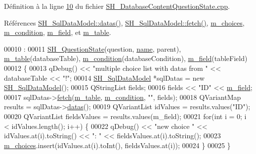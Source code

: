 Définition à la ligne \hyperlink{SH__DatabaseContentQuestionState_8cpp_source_l00010}{10} du fichier \hyperlink{SH__DatabaseContentQuestionState_8cpp_source}{S\-H\-\_\-\-Database\-Content\-Question\-State.\-cpp}.



Références \hyperlink{classSH__SqlDataModel_a6d91d42cfaf86d1fbbaeeb7a32efc26b}{S\-H\-\_\-\-Sql\-Data\-Model\-::datas()}, \hyperlink{classSH__SqlDataModel_a8d9b08d282a304945b9ee2f474020980}{S\-H\-\_\-\-Sql\-Data\-Model\-::fetch()}, \hyperlink{classSH__DatabaseContentQuestionState_a0bbbd0d3b22877dc9e78f81136f31618}{m\-\_\-choices}, \hyperlink{classSH__DatabaseContentQuestionState_aaffd467fccc69b6d46194f04831a1edc}{m\-\_\-condition}, \hyperlink{classSH__DatabaseContentQuestionState_a32b3f4f2cadbc4837add2556c1a926d4}{m\-\_\-field}, et \hyperlink{classSH__DatabaseContentQuestionState_a95d8a6ffc051cd9283314a56f7a11296}{m\-\_\-table}.


\begin{DoxyCode}
00010                                                                                                            
                                                                                :
00011     \hyperlink{classSH__QuestionState_ad7ea575ec284d1dc89da5df9f31cd751}{SH\_QuestionState}(question, \hyperlink{classSH__NamedObject_a970f265df31b28b2179bbbceb6170ac2}{name}, parent), \hyperlink{classSH__DatabaseContentQuestionState_a95d8a6ffc051cd9283314a56f7a11296}{m\_table}(databaseTable), 
      \hyperlink{classSH__DatabaseContentQuestionState_aaffd467fccc69b6d46194f04831a1edc}{m\_condition}(databaseCondition), \hyperlink{classSH__DatabaseContentQuestionState_a32b3f4f2cadbc4837add2556c1a926d4}{m\_field}(tableField)
00012 \{
00013     qDebug() << \textcolor{stringliteral}{"multiple choice list with datas from "} << databaseTable << \textcolor{stringliteral}{"!"};
00014     \hyperlink{classSH__SqlDataModel}{SH\_SqlDataModel} *sqlDatas = \textcolor{keyword}{new} \hyperlink{classSH__SqlDataModel}{SH\_SqlDataModel}();
00015     QStringList fields;
00016     fields << \textcolor{stringliteral}{"ID"} << \hyperlink{classSH__DatabaseContentQuestionState_a32b3f4f2cadbc4837add2556c1a926d4}{m\_field};
00017     sqlDatas->\hyperlink{classSH__SqlDataModel_a8d9b08d282a304945b9ee2f474020980}{fetch}(\hyperlink{classSH__DatabaseContentQuestionState_a95d8a6ffc051cd9283314a56f7a11296}{m\_table}, \hyperlink{classSH__DatabaseContentQuestionState_aaffd467fccc69b6d46194f04831a1edc}{m\_condition}, \textcolor{stringliteral}{""}, fields);
00018     QVariantMap results = sqlDatas->\hyperlink{classSH__SqlDataModel_a6d91d42cfaf86d1fbbaeeb7a32efc26b}{datas}();
00019     QVariantList idValues = results.values(\textcolor{stringliteral}{"ID"});
00020     QVariantList fieldsValues = results.values(m\_field);
00021     \textcolor{keywordflow}{for}(\textcolor{keywordtype}{int} i = 0; i < idValues.length(); i++) \{
00022         qDebug() << \textcolor{stringliteral}{"new choice "} << idValues.at(i).toString() <<  \textcolor{stringliteral}{": "} << fieldsValues.at(i).toString();
00023         \hyperlink{classSH__DatabaseContentQuestionState_a0bbbd0d3b22877dc9e78f81136f31618}{m\_choices}.insert(idValues.at(i).toInt(), fieldsValues.at(i));
00024     \}
00025 \}
\end{DoxyCode}


